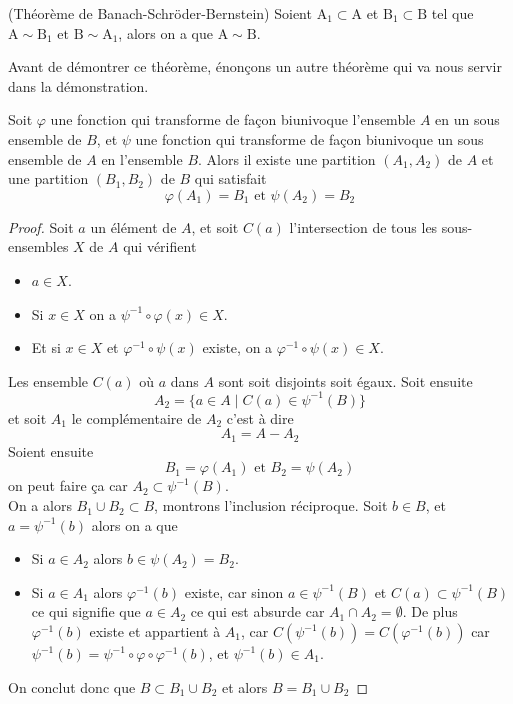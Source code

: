 \begin{T}(Théorème de Banach-Schröder-Bernstein)\label{T1}
  Soient $\mathrm{A}_1 \subset \mathrm{A}$ et $\mathrm{B}_1 \subset \mathrm{B}$ tel que $\mathrm{A} \sim \mathrm{B}_1 \text{ et } \mathrm{B} \sim \mathrm{A}_1$, alors on a que $\mathrm{A} \sim \mathrm{B}$.
\end{T}
\noindent
Avant de démontrer ce théorème, énonçons un autre théorème qui va nous servir dans la démonstration.
\begin{T}\label{T2}
  Soit $\varphi$ une fonction qui transforme de façon biunivoque l'ensemble $A$ en un sous ensemble de $B$, et $\psi$ une fonction qui transforme de façon biunivoque un sous ensemble de $A$ en l'ensemble $B$. Alors il existe une partition $(A_1, A_2)$ de $A$ et une partition $(B_1, B_2)$ de $B$ qui satisfait
  $$\varphi(A_1) = B_1 \text{ et } \psi(A_2) = B_2$$
\end{T}
\begin{proof}
  Soit $a$ un élément de $A$, et soit $C(a)$ l'intersection de tous les sous-ensembles $X$ de $A$ qui vérifient
  \begin{itemize}
    \item $a \in X$.
    \item Si $x\in X$ on a $\psi^{-1} \circ \varphi(x) \in X$.
    \item Et si $x\in X$ et $\varphi^{-1} \circ \psi(x)$ existe, on a $\varphi^{-1} \circ \psi(x) \in X$.
  \end{itemize}
  Les ensemble $C(a)$ où $a$ dans $A$ sont soit disjoints soit égaux. Soit ensuite $$A_2 =  \{a \in A \mid C(a) \in \psi^{-1}(B)\}$$
  et soit $A_1$ le complémentaire de $A_2$ c'est à dire $$A_1 = A-A_2$$ Soient ensuite $$B_1 = \varphi(A_1) \text{ et } B_2 = \psi(A_2)$$
  on peut faire ça car $A_2 \subset \psi^{-1}(B)$.\\
  On a alors $B_1 \cup B_2 \subset B$, montrons l'inclusion réciproque.
  Soit $b \in B$, et $a = \psi^{-1}(b)$ alors on a que
  \begin{itemize}
    \item Si $a \in A_2$ alors $b \in \psi(A_2) = B_2$.
    \item Si $a \in A_1$ alors $\varphi^{-1}(b)$ existe, car sinon $a \in \psi^{-1}(B)$ et $C(a) \subset \psi^{-1}(B)$ ce qui signifie que $a\in A_2$ ce qui est absurde car $A_1 \cap A_2 = \emptyset$. De plus $\varphi^{-1}(b)$ existe et appartient à $A_1$, car $C(\psi^{-1}(b)) = C(\varphi^{-1}(b))$ car $\psi^{-1}(b) = \psi^{-1}\circ \varphi \circ \varphi^{-1}(b)$, et $\psi^{-1}(b) \in A_1$.
  \end{itemize}
  On conclut donc que $B \subset B_1 \cup B_2$ et alors $B = B_1 \cup B_2$
\end{proof}
